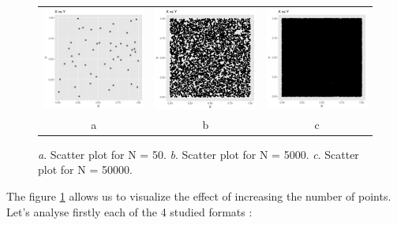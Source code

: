 \documentclass{article}
\begin{document}
\begin{figure}[!ht]
\centering
\begin{tabular}{ccc}
	\includegraphics[width=.3\textwidth]{first_plot}&
	\includegraphics[width=.3\textwidth]{last_plot3}&
	\includegraphics[width=.3\textwidth]{last_plot2}\\
	a&b&c\\
\end{tabular}
\caption{\textit{a}. Scatter plot for N = 50. \textit{b}. Scatter plot for N = 5000. \textit{c}. Scatter plot for N = 50000.}
\label{scatter_plot_format}
\end{figure}
The figure \ref{scatter_plot_format} allows us to visualize the effect of increasing the number of points.
Let's analyse firstly each of the 4 studied formats : 
\end{document}
